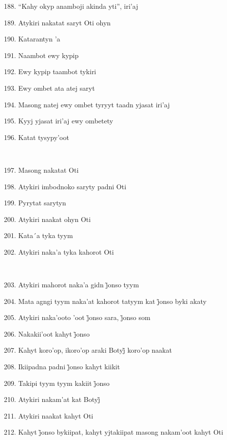 188. ``Kahy okyp anamboji akinda yti'', iri'aj

189. Atykiri nakatat saryt Oti ohyn

190. Katarantyn 'a

191. Naambot ewy kypip

192. Ewy kypip taambot tykiri

193. Ewy ombet ata atej saryt

194. Masong natej ewy ombet tyryyt taadn yjasat iri'aj

195. Kyyj yjasat iri'aj ewy ombetety

196. Katat tysypy'oot

~

197. Masong nakatat Oti

198. Atykiri imbodnoko saryty padni Oti

199. Pyrytat sarytyn

200. Atykiri naakat ohyn Oti

201. Kata´a tyka tyym

202. Atykiri naka'a tyka kahorot Oti

~

203. Atykiri mahorot naka’a gidn j̃onso tyym

204. Mata agngi tyym naka’at kahorot tatyym kat j̃onso byki akaty

205. Atykiri naka’ooto ’oot j̃onso sara, j̃onso som

206. Nakakii’oot kahyt j̃onso

207. Kahyt koro’op, ikoro’op araki Botyj̃ koro’op naakat

208. Ikiipadna padni j̃onso kahyt kiikit

209. Takipi tyym tyym kakiit j̃onso

210. Atykiri nakam’at kat Botyj̃

211. Atykiri naakat kahyt Oti

212. Kahyt j̃onso bykiipat, kahyt yjtakiipat masong nakam’oot kahyt Oti


